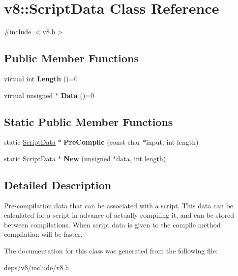 \hypertarget{classv8_1_1_script_data}{}\section{v8\+:\+:Script\+Data Class Reference}
\label{classv8_1_1_script_data}


{\ttfamily \#include $<$v8.\+h$>$}

\subsection*{Public Member Functions}
\begin{DoxyCompactItemize}
\item 
\hypertarget{classv8_1_1_script_data_a6aa1007dfe6b09a5e59443bb1afff0b9}{}virtual int {\bfseries Length} ()=0\label{classv8_1_1_script_data_a6aa1007dfe6b09a5e59443bb1afff0b9}

\item 
\hypertarget{classv8_1_1_script_data_ae3c47fd599a27b5d155328f792765f65}{}virtual unsigned $\ast$ {\bfseries Data} ()=0\label{classv8_1_1_script_data_ae3c47fd599a27b5d155328f792765f65}

\end{DoxyCompactItemize}
\subsection*{Static Public Member Functions}
\begin{DoxyCompactItemize}
\item 
\hypertarget{classv8_1_1_script_data_a4bb3cdd4abbde99a000a0c25b6357520}{}static \hyperlink{classv8_1_1_script_data}{Script\+Data} $\ast$ {\bfseries Pre\+Compile} (const char $\ast$input, int length)\label{classv8_1_1_script_data_a4bb3cdd4abbde99a000a0c25b6357520}

\item 
\hypertarget{classv8_1_1_script_data_a09ee27bc117e1583c214796f5e34f9e8}{}static \hyperlink{classv8_1_1_script_data}{Script\+Data} $\ast$ {\bfseries New} (unsigned $\ast$data, int length)\label{classv8_1_1_script_data_a09ee27bc117e1583c214796f5e34f9e8}

\end{DoxyCompactItemize}


\subsection{Detailed Description}
Pre-\/compilation data that can be associated with a script. This data can be calculated for a script in advance of actually compiling it, and can be stored between compilations. When script data is given to the compile method compilation will be faster. 

The documentation for this class was generated from the following file\+:\begin{DoxyCompactItemize}
\item 
deps/v8/include/v8.\+h\end{DoxyCompactItemize}
